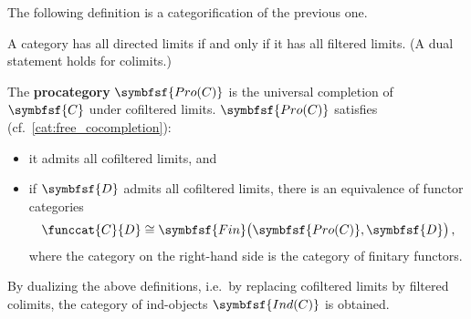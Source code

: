     The following definition is a categorification of the previous one.
    \begin{property}\label{cat:directed_filtered}
        A category has all directed limits if and only if it has all filtered limits. (A dual statement holds for colimits.)
    \end{property}


    \begin{uproperty}\label{cat:pro_object_uproperty}
        The \textbf{procategory} $\symbfsf{Pro(C)}$ is the universal completion of $\symbfsf{C}$ under cofiltered limits. $\symbfsf{Pro(C)}$ satisfies (cf.~\cref{cat:free_cocompletion}):
        \begin{itemize}
            \item it admits all cofiltered limits, and
            \item if $\symbfsf{D}$ admits all cofiltered limits, there is an equivalence of functor categories
            \begin{gather}
                \funccat{C}{D}\cong\symbfsf{Fin}\bigl(\symbfsf{Pro(C)},\symbfsf{D}\bigr)\,,
            \end{gather}
            where the category on the right-hand side is the category of finitary functors.
        \end{itemize}
    \end{uproperty}
    \begin{remark}
        By dualizing the above definitions, i.e.~by replacing cofiltered limits by filtered colimits, the category of ind-objects $\symbfsf{Ind(C)}$ is obtained.
    \end{remark}

